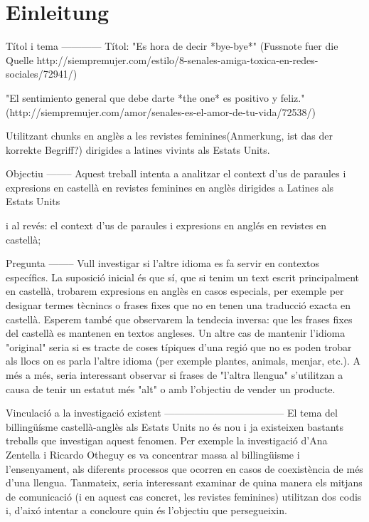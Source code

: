 \section{Einleitung}

\begin{comment}
* ca 3/4 Seiten
* Untersuchungsgegenstand
* Erkenntnisinteresse
* Forschungsstand
* Vorgehensweise: also Section 2 macht blabla, Section 3 blablup, ....
* Ergebnisse können/sollen angedeuten werden
\end{comment}

Títol i tema
------------
Títol:
"Es hora de decir *bye-bye*" (Fussnote fuer die Quelle http://siempremujer.com/estilo/8-senales-amiga-toxica-en-redes-sociales/72941/)

"El sentimiento general que debe darte *the one* es positivo y feliz." (http://siempremujer.com/amor/senales-es-el-amor-de-tu-vida/72538/)

Utilitzant chunks en anglès a les revistes feminines(Anmerkung, ist das der korrekte Begriff?) dirigides a latines vivints als Estats Units.


Objectiu
--------
Aquest treball intenta a analitzar el context d'us de paraules i expresions en castellà en revistes feminines en anglès dirigides a Latines als Estats Units

i al revés:
el context d'us de paraules i expresions en anglés en revistes en castellà;


Pregunta
--------
Vull investigar si l'altre idioma es fa servir en contextos específics.
La suposició inicial és que sí, que si tenim un text escrit principalment en castellà, trobarem expresions en anglès en casos especials,
per exemple per designar termes tècnincs o frases fixes que no en tenen una traducció exacta en castellà.
Esperem també que observarem la tendecia inversa: que les frases fixes del castellà es mantenen en textos angleses.
Un altre cas de mantenir l'idioma "original" seria si es tracte de coses típiques d'una regió que no es poden trobar als llocs on es parla l'altre idioma (per exemple plantes, animals, menjar, etc.).
A més a més, seria interessant observar si frases de "l'altra llengua" s'utilitzan a causa de tenir un estatut més "alt" o amb l'objectiu de vender un producte.


Vinculació a la investigació existent
------------------------------------
El tema del billingüísme castellà-anglès als Estats Units no és nou i ja existeixen bastants treballs que investigan aquest fenomen.
Per exemple la investigació d'Ana Zentella i Ricardo Otheguy es va concentrar massa al billingüisme i l'ensenyament,
als diferents processos que ocorren en casos de coexistència de més d'una llengua.
Tanmateix, seria interessant examinar de quina manera els mitjans de comunicació (i en aquest cas concret, les revistes feminines) utilitzan dos codis i,
d'aixó intentar a concloure quin és l'objectiu que persegueixin.


